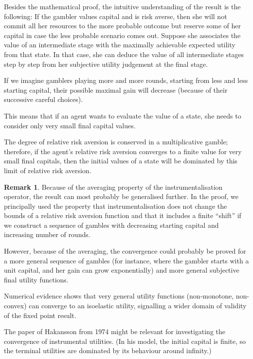 \documentclass{article}
\theoremstyle{definition}
\newtheorem*{remark}{Remark}
\begin{document}
Besides the mathematical proof, the intuitive understanding of the result is the following:
If the gambler values capital and is risk averse, then she will not commit all her resources to the more probable outcome but reserve some of her capital in case the less probable scenario comes out.
Suppose she associates the value of an intermediate stage with the maximally achievable expected utility from that state. In that case, she can deduce the value of all intermediate stages step by step from her subjective utility judgement at the final stage.

If we imagine gamblers playing more and more rounds, starting from less and less starting capital, their possible maximal gain will decrease (because of their successive careful choices).

This means that if an agent wants to evaluate the value of a state, she needs to consider only very small final capital values.

The degree of relative risk aversion is conserved in a multiplicative gamble; therefore, if the agent's relative risk aversion converges to a finite value for very small final capitals, then the initial values of a state will be dominated by this limit of relative risk aversion.


\begin{remark}
    Because of the averaging property of the instrumentalisation operator, the result can most probably be generalised further. In the proof, we principally used the property that instrumentalisation does not change the bounds of a relative risk aversion function and that it includes a finite ``shift'' if we construct a sequence of gambles with decreasing starting capital and increasing number of rounds.

    However, because of the averaging, the convergence could probably be proved for a more general sequence of gambles (for instance, where the gambler starts with a unit capital, and her gain can grow exponentially) and more general subjective final utility functions.

    Numerical evidence shows that very general utility functions (non-monotone, non-convex) can converge to an isoelastic utility, signalling a wider domain of validity of the fixed point result.
    
\end{remark}

The paper of Hakansson from 1974 \cite{paper:IsoelasticConvergence} might be relevant for investigating the convergence of instrumental utilities. (In his model, the initial capital is finite, so the terminal utilities are dominated by its behaviour around infinity.)
\end{document}
